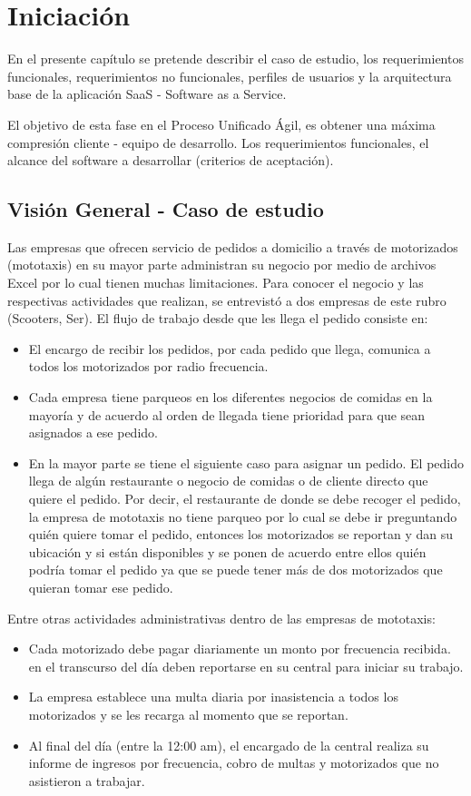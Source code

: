 \chapter{Iniciación}
\noindent En el presente capítulo se pretende describir el caso de estudio, los requerimientos funcionales, requerimientos no funcionales, perfiles de usuarios y la arquitectura base de la aplicación SaaS - Software as a Service.

\noindent El objetivo de esta fase en el Proceso Unificado Ágil, es obtener una máxima compresión cliente - equipo de desarrollo. Los requerimientos funcionales, el alcance del software a desarrollar (criterios de aceptación).

\section {Visión General - Caso de estudio}
\noindent Las empresas que ofrecen servicio de pedidos a domicilio a través de motorizados (mototaxis) en su mayor parte administran su negocio por medio de archivos Excel por lo cual tienen muchas limitaciones.
Para conocer el negocio y las respectivas actividades que realizan, se entrevistó a dos empresas de este rubro (Scooters, Ser). El flujo de trabajo desde que les llega el pedido consiste en:
\begin{itemize}
\item El encargo de recibir los pedidos, por cada pedido que llega, comunica a todos los motorizados por radio frecuencia.
\item Cada empresa tiene parqueos en los diferentes negocios de comidas en la mayoría y de acuerdo al orden de llegada tiene prioridad para que sean asignados a ese pedido.
\item En la mayor parte se tiene el siguiente caso para asignar un pedido. El pedido llega de algún restaurante o negocio de comidas o de cliente directo que quiere el pedido. Por decir, el restaurante de donde se debe recoger el pedido, la empresa de mototaxis no tiene parqueo por lo cual se debe ir preguntando quién quiere tomar el pedido, entonces los motorizados se reportan y dan su ubicación y si están disponibles y se ponen de acuerdo entre ellos quién podría tomar el pedido ya que se puede tener más de dos motorizados que quieran tomar ese pedido.
\end{itemize}
\indent Entre otras actividades administrativas dentro de las empresas de mototaxis:
\begin{itemize}
\item Cada motorizado debe pagar diariamente un monto por frecuencia recibida. en el transcurso del día deben reportarse en su central para iniciar su trabajo.
\item La empresa establece una multa diaria por inasistencia a todos los motorizados y se les recarga al momento que se reportan.
\item Al final del día (entre la 12:00 am), el encargado de la central realiza su informe de ingresos por frecuencia, cobro de multas y motorizados que no asistieron a trabajar.
\end{itemize}
